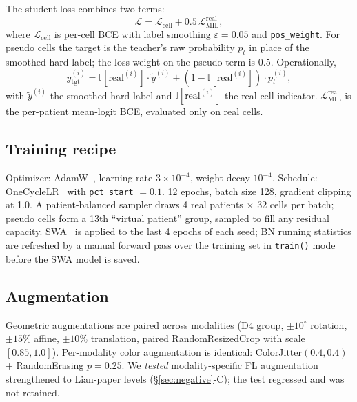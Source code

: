 \documentclass[conference]{IEEEtran}
\begin{document}
The student loss combines two terms:
\begin{equation}
\mathcal{L} = \mathcal{L}_{\text{cell}} + 0.5\,\mathcal{L}_{\text{MIL}}^{\text{real}},
\end{equation}
where $\mathcal{L}_{\text{cell}}$ is per-cell BCE with label smoothing $\varepsilon = 0.05$ and \texttt{pos\_weight}. For pseudo cells the target is the teacher's raw probability $p_t$ in place of the smoothed hard label; the loss weight on the pseudo term is 0.5. Operationally,
\begin{equation}
y_{\text{tgt}}^{(i)} = \mathbb{I}[\text{real}^{(i)}] \cdot \tilde{y}^{(i)} + (1-\mathbb{I}[\text{real}^{(i)}]) \cdot p_t^{(i)},
\end{equation}
with $\tilde{y}^{(i)}$ the smoothed hard label and $\mathbb{I}[\text{real}^{(i)}]$ the real-cell indicator. $\mathcal{L}_{\text{MIL}}^{\text{real}}$ is the per-patient mean-logit BCE, evaluated only on real cells.

\subsection{Training recipe}

Optimizer: AdamW~\cite{loshchilov2017adamw}, learning rate $3 \times 10^{-4}$, weight decay $10^{-4}$. Schedule: OneCycleLR~\cite{smith2018onecycle} with \texttt{pct\_start} $=0.1$. 12 epochs, batch size 128, gradient clipping at 1.0. A patient-balanced sampler draws 4 real patients $\times$ 32 cells per batch; pseudo cells form a 13th ``virtual patient'' group, sampled to fill any residual capacity. SWA~\cite{izmailov2018swa} is applied to the last 4 epochs of each seed; BN running statistics are refreshed by a manual forward pass over the training set in \texttt{train()} mode before the SWA model is saved.

\subsection{Augmentation}

Geometric augmentations are paired across modalities (D4 group, $\pm 10^{\circ}$ rotation, $\pm 15\%$ affine, $\pm 10\%$ translation, paired RandomResizedCrop with scale $[0.85, 1.0]$). Per-modality color augmentation is identical: ColorJitter$(0.4, 0.4)$ + RandomErasing $p = 0.25$. We \emph{tested} modality-specific FL augmentation strengthened to Lian-paper levels (\S\ref{sec:negative}-C); the test regressed and was not retained.
\end{document}
